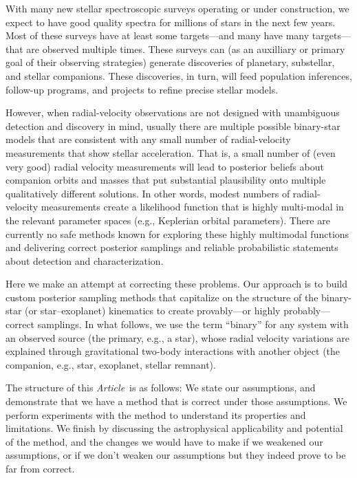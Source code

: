 \documentclass[manuscript, letterpaper]{aastex6}
\newcommand{\documentname}{\textsl{Article}}
\begin{document}
With many new stellar spectroscopic surveys operating or under
construction, we expect to have good quality spectra for millions
of stars in the next few years.
Most of these surveys have at least some targets---and many have many
targets---that are observed multiple times.
These surveys can (as an auxilliary or primary goal of their observing
strategies) generate discoveries of planetary, substellar, and stellar
companions.
These discoveries, in turn, will feed population inferences, follow-up
programs, and projects to refine precise stellar models.

However, when radial-velocity observations are not designed with
unambiguous detection and discovery in mind, usually there are
multiple possible binary-star models that are consistent with any
small number of radial-velocity measurements that show stellar
acceleration.
That is, a small number of (even very good) radial velocity
measurements will lead to posterior beliefs about companion orbits and
masses that put substantial plausibility onto multiple qualitatively
different solutions.
In other words, modest numbers of radial-velocity measurements create a
likelihood function that is highly multi-modal in the relevant parameter spaces
(e.g., Keplerian orbital parameters).
There are currently no safe methods known for exploring these highly
multimodal functions and delivering correct posterior samplings and
reliable probabilistic statements about detection and
characterization.

Here we make an attempt at correcting these problems.
Our approach is to build custom posterior sampling methods that
capitalize on the structure of the binary-star (or star--exoplanet)
kinematics to create provably---or highly probably---correct
samplings.
In what follows, we use the term ``binary'' for any system with an observed
source (the primary, e.g., a star), whose radial velocity variations are
explained through gravitational two-body interactions with another object (the
companion, e.g., star, exoplanet, stellar remnant).

The structure of this \documentname\ is as follows:
We state our assumptions, and demonstrate that we have a
method that is correct under those assumptions.
We perform experiments with the method to understand its properties
and limitations.
We finish by discussing the astrophysical applicability and potential of the
method, and the changes we would have to make if we weakened our assumptions, or
if we don't weaken our assumptions but they indeed prove to be far from correct.
\end{document}
